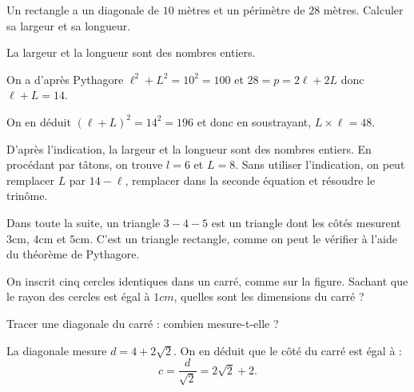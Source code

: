 \begin{exo}[Périmètre et diagonale]
Un rectangle a un diagonale de $10$ mètres et un périmètre de $28$ mètres. Calculer sa largeur et sa longueur.
\begin{center}
\end{center}
\begin{hint}
La largeur et la longueur sont des nombres entiers.
\end{hint}
\begin{sol}
On a d'après Pythagore $\ell^2+L^2=10^2=100$ et $28=p=2\ell+2L$ donc $\ell+L=14$.

On en déduit $(\ell+L)^2=14^2=196$ et donc en soustrayant, $L\times \ell = 48$.

D'après l'indication, la largeur et la longueur sont des nombres entiers.
En procédant par tâtons, on trouve $l=6$ et $L=8$.
Sans utiliser l'indication, on peut remplacer $L$ par $14-\ell$, remplacer dans la seconde équation et résoudre le trinôme.
\end{sol}
\end{exo}




Dans toute la suite, un triangle \og $3-4-5$\fg{} est un triangle dont les côtés mesurent $3$cm, $4$cm et $5$cm. C'est un triangle rectangle, comme on peut le vérifier à l'aide du théorème de Pythagore.




\begin{exo}
On inscrit cinq cercles identiques dans un carré, comme sur la figure.
Sachant que le rayon des cercles est égal à $1cm$, quelles sont les dimensions du carré ?
\begin{center}
\end{center}
\begin{hint}
Tracer une diagonale du carré : combien mesure-t-elle ?
\end{hint}
\begin{sol}
La diagonale mesure $d=4+2\sqrt 2$.
On en déduit que le côté du carré est égal à  :
\[ c = \frac{d}{\sqrt 2} = 2\sqrt 2+2.\]
\end{sol}
\end{exo}







